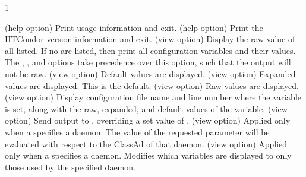 \begin{ManPage}{\label{man-condor-config-val}}{1}
\begin{Options}
   {(help option) 
    Print usage information and exit.
   }
   {(help option) 
    Print the HTCondor version information and exit.
   }
   {(view option)
    Display the raw value of all  listed.  
    If no  are listed, then print all configuration variables and
    their values.
    The , , and  options take
    precedence over this  option, such that the output will 
    not be raw.
   }
   {(view option)
    Default values are displayed.
   }
   {(view option)
    Expanded values are displayed.  This is the default.
   }
   {(view option)
    Raw values are displayed.
   }
   {(view option)
    Display configuration file name and line number where the variable is
    set, along with the raw, expanded, and default values of the variable.
   }
   {(view option)
    Send output to ,
    overriding a set value of . 
   }
   {(view option)
    Applied only when a  specifies a daemon.
    The value of the requested parameter will be evaluated with 
    respect to the ClassAd of that daemon.  
   }
   {(view option)
    Applied only when a  specifies a daemon.
    Modifies which variables are displayed to only those 
    used by the specified daemon.
}
\end{Options}
\end{ManPage}
